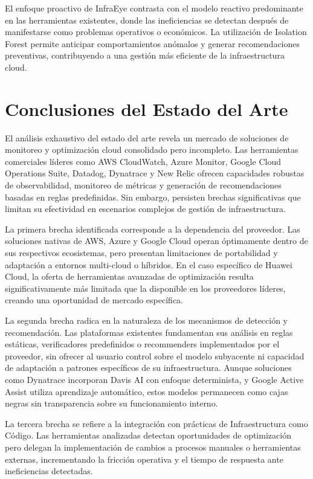 El enfoque proactivo de InfraEye contrasta con el modelo reactivo predominante en las herramientas existentes, donde las ineficiencias se detectan después de manifestarse como problemas operativos o económicos. La utilización de Isolation Forest permite anticipar comportamientos anómalos y generar recomendaciones preventivas, contribuyendo a una gestión más eficiente de la infraestructura cloud.

\section{Conclusiones del Estado del Arte}

El análisis exhaustivo del estado del arte revela un mercado de soluciones de monitoreo y optimización cloud consolidado pero incompleto. Las herramientas comerciales líderes como AWS CloudWatch, Azure Monitor, Google Cloud Operations Suite, Datadog, Dynatrace y New Relic ofrecen capacidades robustas de observabilidad, monitoreo de métricas y generación de recomendaciones basadas en reglas predefinidas. Sin embargo, persisten brechas significativas que limitan su efectividad en escenarios complejos de gestión de infraestructura.

La primera brecha identificada corresponde a la dependencia del proveedor. Las soluciones nativas de AWS, Azure y Google Cloud operan óptimamente dentro de sus respectivos ecosistemas, pero presentan limitaciones de portabilidad y adaptación a entornos multi-cloud o híbridos. En el caso específico de Huawei Cloud, la oferta de herramientas avanzadas de optimización resulta significativamente más limitada que la disponible en los proveedores líderes, creando una oportunidad de mercado específica.

La segunda brecha radica en la naturaleza de los mecanismos de detección y recomendación. Las plataformas existentes fundamentan sus análisis en reglas estáticas, verificadores predefinidos o recommenders implementados por el proveedor, sin ofrecer al usuario control sobre el modelo subyacente ni capacidad de adaptación a patrones específicos de su infraestructura. Aunque soluciones como Dynatrace incorporan Davis AI con enfoque determinista, y Google Active Assist utiliza aprendizaje automático, estos modelos permanecen como cajas negras sin transparencia sobre su funcionamiento interno.

La tercera brecha se refiere a la integración con prácticas de Infraestructura como Código. Las herramientas analizadas detectan oportunidades de optimización pero delegan la implementación de cambios a procesos manuales o herramientas externas, incrementando la fricción operativa y el tiempo de respuesta ante ineficiencias detectadas.

